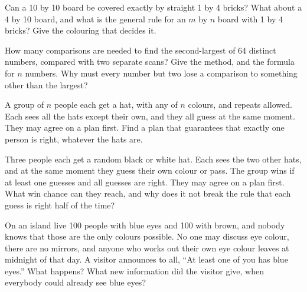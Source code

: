 \begin{question}\label{iq:iv1:logic-riddles:28}
Can a 10 by 10 board be covered exactly by straight 1 by 4 bricks? What about a 4 by 10 board, and what is the general rule for an $m$ by $n$ board with 1 by 4 bricks? Give the colouring that decides it.
\end{question}

\begin{question}\label{iq:iv1:logic-riddles:29}
How many comparisons are needed to find the second-largest of 64 distinct numbers, compared with two separate scans? Give the method, and the formula for $n$ numbers. Why must every number but two lose a comparison to something other than the largest?
\end{question}

\begin{question}\label{iq:iv1:logic-riddles:30}
A group of $n$ people each get a hat, with any of $n$ colours, and repeats allowed. Each sees all the hats except their own, and they all guess at the same moment. They may agree on a plan first. Find a plan that guarantees that exactly one person is right, whatever the hats are.
\end{question}

\begin{question}\label{iq:iv1:logic-riddles:31}
Three people each get a random black or white hat. Each sees the two other hats, and at the same moment they guess their own colour or pass. The group wins if at least one guesses and all guesses are right. They may agree on a plan first. What win chance can they reach, and why does it not break the rule that each guess is right half of the time?
\end{question}

\begin{question}\label{iq:iv1:logic-riddles:32}
On an island live 100 people with blue eyes and 100 with brown, and nobody knows that those are the only colours possible. No one may discuss eye colour, there are no mirrors, and anyone who works out their own eye colour leaves at midnight of that day. A visitor announces to all, ``At least one of you has blue eyes.'' What happens? What new information did the visitor give, when everybody could already see blue eyes?
\end{question}

